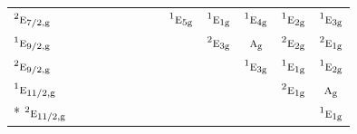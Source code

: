\documentclass[10pt,a4paper]{article}
\numberwithin{equation}{section}
\newcommand{\irr}[1]{\text{\normalfont\scshape #1}}
\newcommand{\conjpair}[1]{{}^{#1}}
\newcommand{\ptag}[1]{\mathrm{#1}}
\begin{document}
{\begin{longtable}{@{}lcccccccccccc@{}}
$\conjpair{2}\irr{e}_{7/2,\ptag{g}}$ &  &  &  &  &  &  &  & $\conjpair{1}\irr{e}_{5\ptag{g}}$ & $\conjpair{1}\irr{e}_{1\ptag{g}}$ & $\conjpair{1}\irr{e}_{4\ptag{g}}$ & $\conjpair{1}\irr{e}_{2\ptag{g}}$ & $\conjpair{1}\irr{e}_{3\ptag{g}}$\\
$\conjpair{1}\irr{e}_{9/2,\ptag{g}}$ &  &  &  &  &  &  &  &  & $\conjpair{2}\irr{e}_{3\ptag{g}}$ & $\irr{a}_{\ptag{g}}$ & $\conjpair{2}\irr{e}_{2\ptag{g}}$ & $\conjpair{2}\irr{e}_{1\ptag{g}}$\\
$\conjpair{2}\irr{e}_{9/2,\ptag{g}}$ &  &  &  &  &  &  &  &  &  & $\conjpair{1}\irr{e}_{3\ptag{g}}$ & $\conjpair{1}\irr{e}_{1\ptag{g}}$ & $\conjpair{1}\irr{e}_{2\ptag{g}}$\\
$\conjpair{1}\irr{e}_{11/2,\ptag{g}}$ &  &  &  &  &  &  &  &  &  &  & $\conjpair{2}\irr{e}_{1\ptag{g}}$ & $\irr{a}_{\ptag{g}}$\\*
$\conjpair{2}\irr{e}_{11/2,\ptag{g}}$ &  &  &  &  &  &  &  &  &  &  &  & $\conjpair{1}\irr{e}_{1\ptag{g}}$\\
\bottomrule\end{longtable}}
\end{document}
